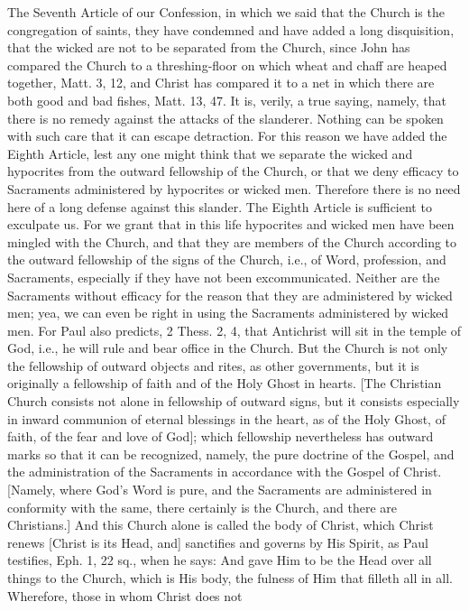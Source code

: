 The Seventh Article of our Confession, in which we said that the
Church is the congregation of saints, they have condemned and have
added a long disquisition, that the wicked are not to be separated
from the Church, since John has compared the Church to a
threshing-floor on which wheat and chaff are heaped together, Matt. 3,
12, and Christ has compared it to a net in which there are both good
and bad fishes, Matt. 13, 47. It is, verily, a true saying, namely,
that there is no remedy against the attacks of the slanderer.
Nothing can be spoken with such care that it can escape detraction.
For this reason we have added the Eighth Article, lest any one might
think that we separate the wicked and hypocrites from the outward
fellowship of the Church, or that we deny efficacy to Sacraments
administered by hypocrites or wicked men.  Therefore there is no need
here of a long defense against this slander.  The Eighth Article is
sufficient to exculpate us.  For we grant that in this life
hypocrites and wicked men have been mingled with the Church, and that
they are members of the Church according to the outward fellowship of
the signs of the Church, i.e., of Word, profession, and Sacraments,
especially if they have not been excommunicated.  Neither are the
Sacraments without efficacy for the reason that they are administered
by wicked men; yea, we can even be right in using the Sacraments
administered by wicked men.  For Paul also predicts, 2 Thess. 2, 4,
that Antichrist will sit in the temple of God, i.e., he will rule and
bear office in the Church.  But the Church is not only the fellowship
of outward objects and rites, as other governments, but it is
originally a fellowship of faith and of the Holy Ghost in hearts.
[The Christian Church consists not alone in fellowship of outward
signs, but it consists especially in inward communion of eternal
blessings in the heart, as of the Holy Ghost, of faith, of the fear
and love of God]; which fellowship nevertheless has outward marks so
that it can be recognized, namely, the pure doctrine of the Gospel,
and the administration of the Sacraments in accordance with the
Gospel of Christ.  [Namely, where God's Word is pure, and the
Sacraments are administered in conformity with the same, there
certainly is the Church, and there are Christians.] And this Church
alone is called the body of Christ, which Christ renews [Christ is
its Head, and] sanctifies and governs by His Spirit, as Paul
testifies, Eph. 1, 22 sq., when he says: And gave Him to be the Head
over all things to the Church, which is His body, the fulness of Him
that filleth all in all.  Wherefore, those in whom Christ does not
